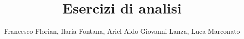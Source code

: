 \documentclass[a4paper,twoside,10pt,italian]{article}
\title{Esercizi di analisi}
\author{Francesco Florian, Ilaria Fontana, Ariel Aldo Giovanni Lanza, Luca Marconato}
\begin{document}
 \maketitlepage
 \tableofcontents
 
\end{document}
